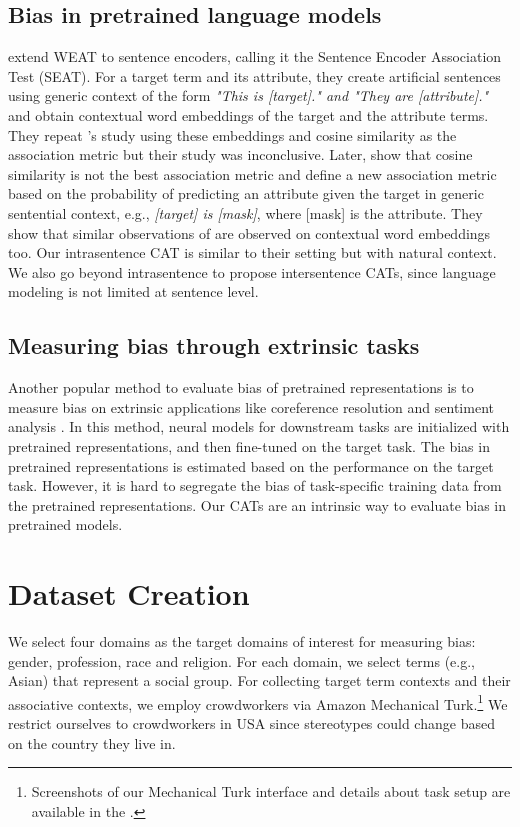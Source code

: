 \documentclass[11pt,a4paper]{article}
\begin{document}
\subsection{Bias in pretrained language models}

\citet{may_measuring_2019} extend WEAT to sentence encoders, calling it the Sentence Encoder Association Test (SEAT).
For a target term and its attribute, they create artificial sentences using generic context of the form \textit{"This is [target]." and "They are [attribute]."} and obtain contextual word embeddings of the target and the attribute terms.
They repeat \citet{caliskan_semantics_2017}'s study using these embeddings and cosine similarity as the association metric but their study was inconclusive.
Later, \citet{Kurita2019} show that cosine similarity is not the best association metric and define a new association metric based on the probability of predicting an attribute given the target in generic sentential context, e.g., \textit{[target] is [mask]}, where [mask] is the attribute.
They show that similar observations of \citet{caliskan_semantics_2017} are observed on contextual word embeddings too.
Our intrasentence CAT is similar to their setting but with natural context.
We also go beyond intrasentence to propose intersentence CATs, since language modeling is not limited at sentence level.




\subsection{Measuring bias through extrinsic tasks}
Another popular method to evaluate bias of pretrained representations is to measure bias on extrinsic applications like coreference resolution
\cite{rudinger2018gender,zhao_gender_2018} and sentiment analysis \cite{kiritchenko_examining_2018}.
In this method, neural models for downstream tasks are initialized with pretrained representations, and then fine-tuned on the target task.
The bias in pretrained representations is estimated  based on the performance on the target task. 
However, it is hard to segregate the bias of task-specific training data from the pretrained representations.
Our CATs are an intrinsic way to evaluate bias in pretrained models.


\section{Dataset Creation}

We select four domains as the target domains of interest for measuring bias: gender, profession, race and religion.
For each domain, we select terms (e.g., Asian) that represent a social group.
For collecting target term contexts and their associative contexts, we employ crowdworkers via Amazon Mechanical Turk.\footnote{Screenshots of our Mechanical Turk interface and details about task setup are available in the .}
We restrict ourselves to crowdworkers in USA since stereotypes could change based on the country they live in.
\end{document}
